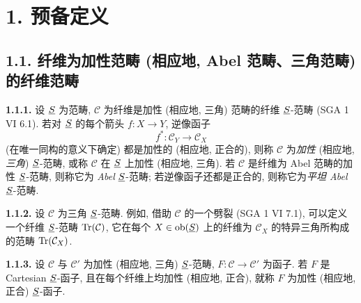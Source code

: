 \section*{1. 预备定义}

\subsection*{1.1. 纤维为加性范畴 (相应地, Abel 范畴、三角范畴) 的纤维范畴}

\textbf{1.1.1.} 设 \(\underline S\) 为范畴, \(\mathcal C\) 为纤维是加性 (相应地, 三角) 范畴的纤维 \(\underline S\)-范畴 (SGA 1 VI 6.1). 若对 \(\underline S\) 的每个箭头 \(f:X\to Y\), 逆像函子
\[
  f^*:\mathcal C_Y\longrightarrow \mathcal C_X
\]
(在唯一同构的意义下确定) 都是加性的 (相应地, 正合的), 则称 \(\mathcal C\) 为\emph{加性} (相应地, \emph{三角}) \(\underline S\)-范畴, 或称 \(\mathcal C\) 在 \(\underline S\) 上加性 (相应地, 三角). 若 \(\mathcal C\) 是纤维为 Abel 范畴的加性 \(\underline S\)-范畴, 则称它为 \emph{Abel} \(\underline S\)-范畴; 若逆像函子还都是正合的, 则称它为\emph{平坦 Abel} \(\underline S\)-范畴.

\textbf{1.1.2.} 设 \(\mathcal C\) 为三角 \(\underline S\)-范畴. 例如, 借助 \(\mathcal C\) 的一个劈裂 (SGA 1 VI 7.1), 可以定义一个纤维 \(\underline S\)-范畴 \(\operatorname{Tr}(\mathcal C)\), 它在每个 \(X\in \operatorname{ob}(\underline S)\) 上的纤维为 \(\mathcal C_X\) 的特异三角所构成的范畴 \(\operatorname{Tr}(\mathcal C_X)\).

\textbf{1.1.3.} 设 \(\mathcal C\) 与 \(\mathcal C'\) 为加性 (相应地, 三角) \(\underline S\)-范畴, \(F:\mathcal C\to\mathcal C'\) 为函子. 若 \(F\) 是 Cartesian \(\underline S\)-函子, 且在每个纤维上均加性 (相应地, 正合), 就称 \(F\) 为加性 (相应地, 正合) \(\underline S\)-函子.



\providecommand{\cC}{\mathcal C}
\providecommand{\cD}{\mathcal D}
\providecommand{\cK}{\mathcal K}
\providecommand{\cO}{\mathcal O}
\providecommand{\cS}{\mathcal S}
\providecommand{\Cpx}{\mathrm C}
\providecommand{\Kpx}{\mathrm K}
\providecommand{\Dpx}{\mathrm D}
\providecommand{\D}{\mathrm D}
\providecommand{\Ho}{\mathrm H}
\providecommand{\RHom}{\mathrm R\!\operatorname{Hom}}
\providecommand{\Ob}{\operatorname{ob}}
\providecommand{\Coker}{\operatorname{Coker}}
\providecommand{\Ker}{\operatorname{Ker}}
\providecommand{\Im}{\operatorname{Im}}
\providecommand{\Hom}{\operatorname{Hom}}
\providecommand{\Cone}{\operatorname{Cone}}
\providecommand{\id}{\operatorname{Id}}
\providecommand{\qis}{\xrightarrow{\sim}}


